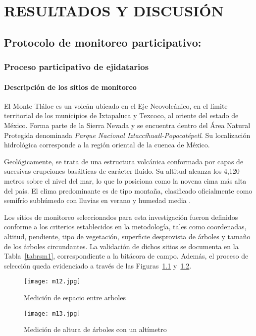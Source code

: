 \chapter{RESULTADOS Y DISCUSIÓN}


\section{Protocolo de monitoreo participativo:}
\subsection{Proceso participativo de ejidatarios}
\subsubsection{Descripción de los sitios de monitoreo}

El Monte Tláloc es un volcán ubicado en el Eje Neovolcánico, en el límite territorial de los municipios de Ixtapaluca y Texcoco, al oriente del estado de México. Forma parte de la Sierra Nevada y se encuentra dentro del Área Natural Protegida denominada \textit{Parque Nacional Iztaccíhuatl-Popocatépetl}. Su localización hidrológica corresponde a la región oriental de la cuenca de México.

Geológicamente, se trata de una estructura volcánica conformada por capas de sucesivas erupciones basálticas de carácter fluido. Su altitud alcanza los 4,120 metros sobre el nivel del mar, lo que lo posiciona como la novena cima más alta del país. El clima predominante es de tipo montaña, clasificado oficialmente como semifrío subhúmedo con lluvias en verano y humedad media \cite{inegi_texcoco}.

Los sitios de monitoreo seleccionados para esta investigación fueron definidos conforme a los criterios establecidos en la metodología, tales como coordenadas, altitud, pendiente, tipo de vegetación, superficie desprovista de árboles y tamaño de los árboles circundantes. La validación de dichos sitios se documenta en la Tabla~\ref{tabrsm1}, correspondiente a la bitácora de campo. Además, el proceso de selección queda evidenciado a través de las Figuras~\ref{m12} y~\ref{m13}.


\begin{figure}[ht]
\centering
  \texttt{[image: m12.jpg]}
  \caption{Medición de espacio entre arboles}
  \label{m12}
\end{figure}
\begin{figure}[ht]
\centering
  \texttt{[image: m13.jpg]}
  \caption{Medición de altura de árboles con un altímetro}
  \label{m13}
\end{figure}

